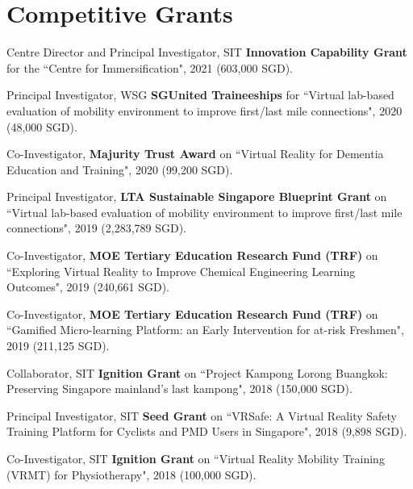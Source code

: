 \documentclass[10pt,a4paper]{article}
\renewenvironment{itemize}{
    \begin{list}{}{
            \setlength{\leftmargin}{1.5em}
            \setlength{\itemsep}{0.25em}
            \setlength{\parskip}{0pt}
            \setlength{\parsep}{0.25em}
        }
        }{
    \end{list}
}
\begin{document}


\section*{Competitive Grants}

\begin{itemize}

    \item Centre Director and Principal Investigator, SIT \textbf{Innovation Capability Grant} for the ``Centre for Immersification", 2021 (603,000 SGD).

    \item Principal Investigator, WSG \textbf{SGUnited Traineeships} for ``Virtual lab-based evaluation of mobility environment to improve first/last mile connections", 2020 (48,000 SGD).

    \item Co-Investigator, \textbf{Majurity Trust Award} on ``Virtual Reality for Dementia Education and Training", 2020 (99,200 SGD).
        
    \item Principal Investigator, \textbf{LTA Sustainable Singapore Blueprint Grant} on ``Virtual lab-based evaluation of mobility environment to improve first/last mile connections", 2019 (2,283,789 SGD).

    \item Co-Investigator, \textbf{MOE Tertiary Education Research Fund (TRF)} on ``Exploring Virtual Reality to Improve Chemical Engineering Learning Outcomes", 2019 (240,661 SGD).

    \item Co-Investigator, \textbf{MOE Tertiary Education Research Fund (TRF)} on ``Gamified Micro-learning Platform: an Early Intervention for at-risk Freshmen", 2019 (211,125 SGD).

    \item Collaborator, SIT \textbf{Ignition Grant} on ``Project Kampong Lorong Buangkok: Preserving Singapore mainland's last kampong", 2018 (150,000 SGD).

    \item Principal Investigator, SIT \textbf{Seed Grant} on ``VRSafe: A Virtual Reality Safety Training Platform for Cyclists and PMD Users in Singapore", 2018 (9,898 SGD).

    \item Co-Investigator, SIT \textbf{Ignition Grant} on ``Virtual Reality Mobility Training (VRMT) for Physiotherapy", 2018 (100,000 SGD).


\end{itemize}
\end{document}
